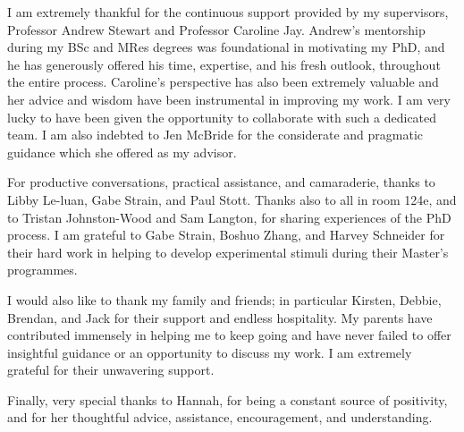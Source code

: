 I am extremely thankful for the continuous support provided by my supervisors, Professor Andrew Stewart and Professor Caroline Jay. Andrew’s mentorship during my BSc and MRes degrees was foundational in motivating my PhD, and he has generously offered his time, expertise, and his fresh outlook, throughout the entire process. Caroline's perspective has also been extremely valuable and her advice and wisdom have been instrumental in improving my work. I am very lucky to have been given the opportunity to collaborate with such a dedicated team. I am also indebted to Jen McBride for the considerate and pragmatic guidance which she offered as my advisor.

For productive conversations, practical assistance, and camaraderie, thanks to Libby Le-luan, Gabe Strain, and Paul Stott. Thanks also to all in room 124e, and to Tristan Johnston-Wood and Sam Langton, for sharing experiences of the PhD process. I am grateful to Gabe Strain, Boshuo Zhang, and Harvey Schneider for their hard work in helping to develop experimental stimuli during their Master’s programmes.

I would also like to thank my family and friends; in particular Kirsten, Debbie, Brendan, and Jack for their support and endless hospitality. My parents have contributed immensely in helping me to keep going and have never failed to offer insightful guidance or an opportunity to discuss my work. I am extremely grateful for their unwavering support.

Finally, very special thanks to Hannah, for being a constant source of positivity, and for her thoughtful advice, assistance, encouragement, and understanding.